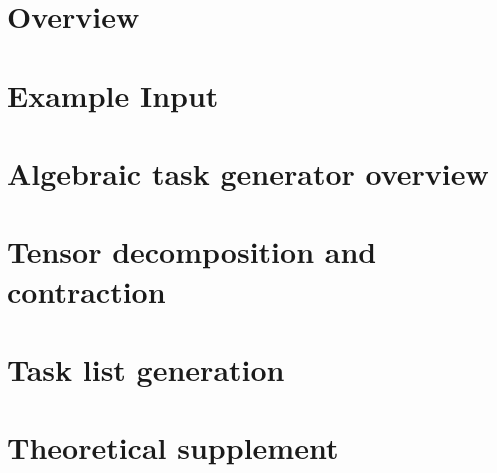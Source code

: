 \documentclass[12pt]{report}
\begin{document}
\tableofcontents

\chapter*{Overview}


\chapter{Example Input}


\chapter{Algebraic task generator overview}


\chapter{Tensor decomposition and contraction}


\chapter{Task list generation}


\chapter{Theoretical supplement}


{}

\end{document}
